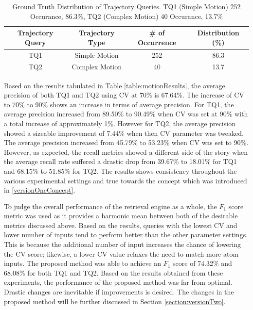 \begin{table}[bht!]
\centering
  \caption{Ground Truth Distribution of Trajectory Queries. TQ1 (Simple Motion)
  252 Occurance, 86.3\%, TQ2 (Complex Motion) 40 Occurance, 13.7\%}
\label{table:motiondist}
\begin{tabular}{cccc}
\toprule
Trajectory Query &  Trajectory Type & \# of Occurrence & Distribution (\%)   \\
\midrule
TQ1       & Simple Motion       & 252 & 86.3   \\
TQ2      & Complex Motion       & 40 & 13.7  \\
\bottomrule
\end{tabular}
\end{table}

Based on the results tabulated in Table \ref{table:motionResults}, the average
precision of both TQ1 and TQ2 using CV at 70\% is 67.64\%. The increase of CV
to 70\% to 90\% shows an increase in terms of average precision. For TQ1, the
average precision increased from 89.50\% to 90.49\% when CV was set at 90\%
with a total increase of approximately 1\%. However for TQ2, the average
precision showed a sizeable improvement of 7.44\% when then CV parameter was
tweaked. The average precision increased from 45.79\% to 53.23\% when CV was
set to 90\%.
However, as expected, the recall metrics showed a different side of the story
when the average recall rate suffered a drastic drop from 39.67\% to 18.01\%
for TQ1 and 68.15\% to 51.85\% for TQ2. The results shows consistency
throughout the various experimental settings and true towards the concept which
was introduced in \ref{versionOneConcept}.

To judge the overall performance of the retrieval engine as a whole, the $F_1$
score metric was used as it provides a harmonic mean between both of the
desirable metrics discussed above. Based on the results, queries with the lowest
CV and lower number of inputs tend to perform better than the other parameter
settings.
This is because the additional number of input increases the chance of lowering
the CV score; likewise, a lower CV value relaxes the need to match more atom
inputs.
The proposed method was able to achieve an $F_1$ score of 74.32\% and 68.08\%
for both TQ1 and TQ2.
Based on the results obtained from these experiments, the performance of the
proposed method was far from optimal. Drastic changes are inevitable if
improvements is desired. The changes in the proposed method will be further
discussed in Section \ref{section:versionTwo}.


